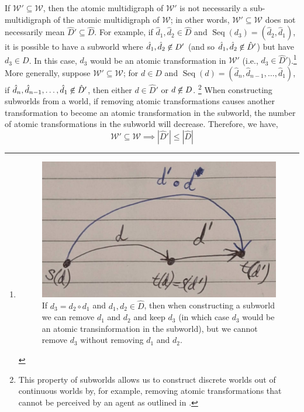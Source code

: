 If $\mathscr{W}' \subseteq \mathscr{W}$, then the atomic multidigraph of $\mathscr{W}'$ is not necessarily a sub-multidigraph of the atomic multidigraph of $\mathscr{W}$; in other words, $\mathscr{W}' \subseteq \mathscr{W}$ does not necessarily mean $\hat{D}' \subseteq \hat{D}$. For example, if $\hat{d}_{1}, \hat{d}_{2} \in \hat{D}$ and $\operatorname{Seq}(d_{3}) = (\hat{d}_{2}, \hat{d}_{1})$, it is possible to have a subworld where $\hat{d}_{1}, \hat{d}_{2} \centernot\in D'$ (and so $\hat{d}_{1}, \hat{d}_{2} \centernot\in \hat{D}'$) but have $d_{3} \in D$.
In this case, $d_{3}$ would be an atomic transformation in $\mathscr{W}'$ (i.e., $d_{3} \in \hat{D}'$).\footnote{
\begin{figure}[H]
    \includegraphics[width=0.5\linewidth]{2MathematicalFramework/Images/transformation_composition.jpg}
    \caption{
    If $d_{3} = d_{2} \circ d_{1}$ and $d_{1}, d_{2} \in \hat{D}$, then when constructing a subworld we can remove $d_{1}$ and $d_{2}$ and keep $d_{3}$ (in which case $d_{3}$ would be an atomic transinformation in the subworld), but we cannot remove $d_{3}$ without removing $d_{1}$ and $d_{2}$.
    }
\end{figure}
}
More generally, suppose $\mathscr{W}' \subseteq \mathscr{W}$; for $d \in D$ and $\operatorname{Seq}(d) = (\hat{d}_{n}, \hat{d}_{n-1}, \dots, \hat{d}_{1})$, if $\hat{d}_{n}, \hat{d}_{n-1}, \dots, \hat{d}_{1} \centernot\in \hat{D}'$, then either $d \in \hat{D}'$ or $d \centernot\in D$.
\footnote{
This property of subworlds allows us to construct discrete worlds out of continuous worlds by, for example, removing atomic transformations that cannot be perceived by an agent as outlined in 
.
}
When constructing subworlds from a world, if removing atomic transformations causes another transformation to become an atomic transformation in the subworld, the number of atomic transformations in the subworld will decrease.
Therefore, we have,
\begin{equation}
    \mathscr{W}' \subseteq \mathscr{W} \implies |\hat{D}'| \leq |\hat{D}|
\end{equation}




